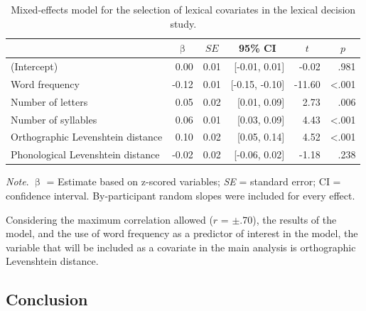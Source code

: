 \documentclass[
  12pt,
  man,floatsintext]{apa7}
\begin{document}
\begin{table}[H]

\caption{\label{tab:lexicaldecision-lexical-covariates-selection}Mixed-effects model for the selection of lexical covariates in the lexical decision study.}
\centering
\begin{threeparttable}
\begin{tabular}[t]{lrrrrr}
\toprule
\multicolumn{1}{c}{ } & \multicolumn{1}{c}{$\upbeta$} & \multicolumn{1}{c}{$SE$} & \multicolumn{1}{c}{95\% CI} & \multicolumn{1}{c}{$t$} & \multicolumn{1}{c}{$p$}\\
\midrule
(Intercept) & 0.00 & 0.01 & {}[-0.01, 0.01] & -0.02 & .981\\
Word frequency & -0.12 & 0.01 & {}[-0.15, -0.10] & -11.60 & <.001\\
Number of letters & 0.05 & 0.02 & {}[0.01, 0.09] & 2.73 & .006\\
Number of syllables & 0.06 & 0.01 & {}[0.03, 0.09] & 4.43 & <.001\\
Orthographic Levenshtein distance & 0.10 & 0.02 & {}[0.05, 0.14] & 4.52 & <.001\\
Phonological Levenshtein distance & -0.02 & 0.02 & {}[-0.06, 0.02] & -1.18 & .238\\
\bottomrule
\end{tabular}
\begin{tablenotes}
\item \textit{\linebreak} 
\item \textit{Note}. $\upbeta$ = Estimate based on z-scored variables; \textit{SE} = standard error; \linebreak \phantom{.}CI = confidence interval. By-participant random slopes were included for \linebreak \phantom{.}every effect.
\end{tablenotes}
\end{threeparttable}
\end{table}

Considering the maximum correlation allowed (\(r\) = \(\pm\).70), the results of the model, and the use of word frequency as a predictor of interest in the model, the variable that will be included as a covariate in the main analysis is orthographic Levenshtein distance.

\hypertarget{conclusion}{%
\subsection{Conclusion}\label{conclusion}}
\end{document}
